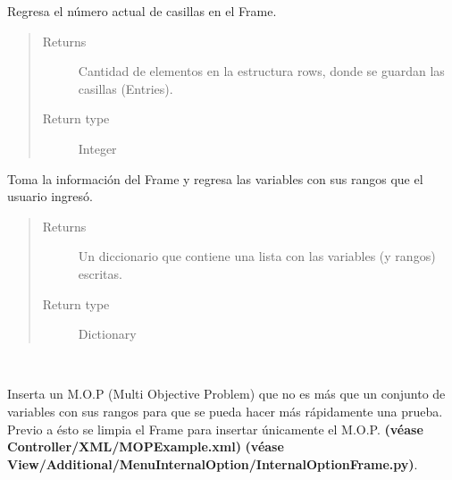 \documentclass[class=report, crop=false]{standalone}
\begin{document}
\begin{fulllineitems}
\begin{fulllineitems}

Regresa el número actual de casillas en el Frame.

\begin{quote}\begin{description}
\item[{Returns}] \leavevmode
Cantidad de elementos en la estructura rows, donde se guardan las casillas (Entries).
\item[{Return type}] \leavevmode
Integer
\end{description}\end{quote}

\end{fulllineitems}

\begin{fulllineitems}

Toma la información del Frame y regresa las variables con 
sus rangos que el usuario ingresó.

\begin{quote}\begin{description}
\item[{Returns}] \leavevmode
Un diccionario que contiene una lista con las variables (y rangos) escritas.
\item[{Return type}] \leavevmode
Dictionary
\end{description}\end{quote}

\end{fulllineitems}

\begin{fulllineitems}

~
\vspace{-0.3cm}

Inserta un M.O.P (Multi Objective Problem) que no es más 
que un conjunto de variables con sus rangos para que se 
pueda hacer más rápidamente una prueba.\break
Previo a ésto se limpia el Frame para insertar únicamente 
el M.O.P.\break
\textbf{(véase Controller/XML/MOPExample.xml)}\break
\textbf{(véase View/Additional/MenuInternalOption/InternalOptionFrame.py)}.


\end{fulllineitems}
\end{fulllineitems}
\end{document}
